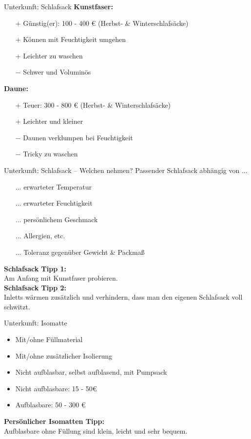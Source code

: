\documentclass{beamer}
\begin{document}
			\begin{frame}{Unterkunft: Schlafsack}
				\textbf{Kunstfaser:}
				\begin{itemize}
					\item[$+$] Günstig(er): 100 - 400 € (Herbst- \& Winterschlafsäcke)
					\item[$+$] Können mit Feuchtigkeit umgehen
					\item[$+$] Leichter zu waschen
					\item[$-$] Schwer und Voluminös
				\end{itemize}\pause
				\textbf{Daune:}
				\begin{itemize}
					\item[$+$] Teuer: 300 - 800 € (Herbst- \& Winterschlafsäcke)
					\item[$+$] Leichter und kleiner
					\item[$-$] Daunen verklumpen bei Feuchtigkeit
					\item[$-$] Tricky zu waschen
				\end{itemize}
			\end{frame}
			
			\begin{frame}{Unterkunft: Schlafsack -- Welchen nehmen?}
				Passender Schlafsack abhängig von ...
				\begin{itemize}
					\item[...] erwarteter Temperatur
					\item[...] erwarteter Feuchtigkeit
					\item[...] persönlichem Geschmack
					\item[...] Allergien, etc.
					\item[...] Toleranz gegenüber Gewicht \& Packmaß
				\end{itemize}\pause
				\vspace{0.2cm}
				\textbf{Schlafsack Tipp 1:}\\Am Anfang mit Kunstfaser probieren.\\
				\pause
				\vspace{0.2cm}
				\textbf{Schlafsack Tipp 2:}\\Inletts wärmen zusätzlich und verhindern, dass man den eigenen Schlafsack voll schwitzt.
			\end{frame}
			
			\begin{frame}{Unterkunft: Isomatte}
				\begin{itemize}
					\item Mit/ohne Füllmaterial
					\item Mit/ohne zusätzlicher Isolierung
					\item Nicht aufblasbar, selbst aufblasend, mit Pumpsack
					\item Nicht aufblasbare: 15 - 50€
					\item Aufblasbare: 50 - 300 €
				\end{itemize}\pause
				\vspace{0.2cm}
				\textbf{Persönlicher Isomatten Tipp:}\\Aufblasbare ohne Füllung sind klein, leicht und sehr bequem.
			\end{frame}
			
\end{document}
